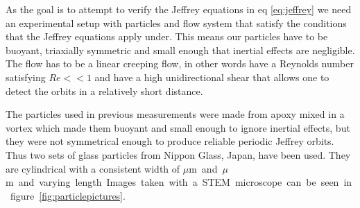 As the goal is to attempt to verify the Jeffrey equations in eq \ref{eq:jeffrey} we need an experimental setup with 
particles and flow system that satisfy the conditions that the Jeffrey equations apply under. This means our particles 
have to be buoyant, triaxially symmetric and small enough that inertial effects are negligible. The flow has to be a 
linear creeping flow, in other words have a Reynolds number satisfying $Re << 1$ and have a high unidirectional shear 
that allows one to detect the orbits in a relatively short distance.


The particles used in previous measurements were made from apoxy mixed in a vortex\cite{JonasExperiment} which made 
them buoyant and small enough to ignore inertial effects, but they were not symmetrical enough to produce reliable 
periodic Jeffrey orbits. Thus two sets of glass particles from Nippon Glass, Japan\cite{Particles}, have been used. 
They are cylindrical with a consistent width of \unit[3]{$\mu$m} and \unit[5]{$\mu$m} and varying length. Images taken 
with a STEM microscope can be seen in figure \ref{fig:particlepictures}. 


